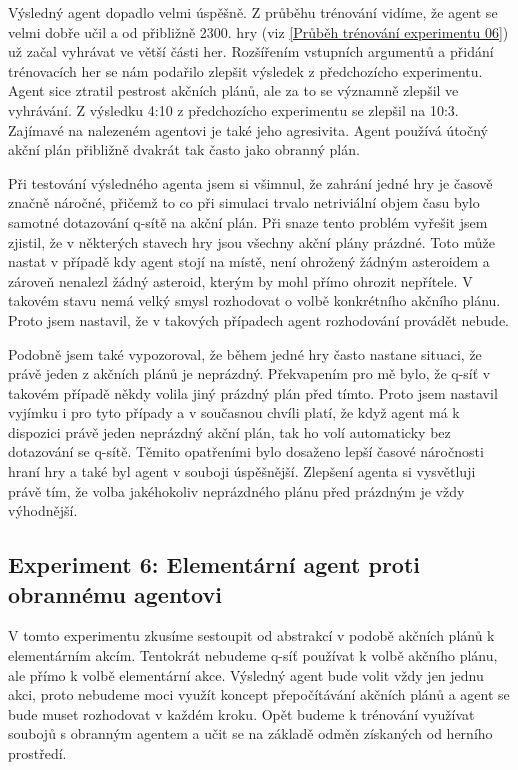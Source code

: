 Výsledný agent dopadlo velmi úspěšně. Z průběhu trénování vidíme, že agent se velmi dobře učil a od přibližně 2300. hry (viz \ref{Průběh trénování experimentu 06}) už začal vyhrávat ve větší části her.
Rozšířením vstupních argumentů a přidání trénovacích her se nám podařilo zlepšit výsledek z předchozícho experimentu.
Agent sice ztratil pestrost akčních plánů, ale za to se významně zlepšil ve vyhrávání. Z výsledku 4:10 z předchozícho experimentu se zlepšil na 10:3.
Zajímavé na nalezeném agentovi je také jeho agresivita. Agent používá útočný akční plán přibližně dvakrát tak často jako obranný plán.

Při testování výsledného agenta jsem si všimnul, že zahrání jedné hry je časově značně náročné, přičemž to co při simulaci trvalo netriviální objem času bylo samotné dotazování q-sítě na akční plán.
Při snaze tento problém vyřešit jsem zjistil, že v některých stavech hry jsou všechny akční plány prázdné. 
Toto může nastat v případě kdy agent stojí na místě, není ohrožený žádným asteroidem a zároveň nenalezl žádný asteroid, kterým by mohl přímo ohrozit nepřítele.
V takovém stavu nemá velký smysl rozhodovat o volbě konkrétního akčního plánu. Proto jsem nastavil, že v takových případech agent rozhodování provádět nebude.

Podobně jsem také vypozoroval, že během jedné hry často nastane situaci, že právě jeden z akčních plánů je neprázdný. Překvapením pro mě bylo, že q-síť v takovém případě někdy volila jiný prázdný plán před tímto.
Proto jsem nastavil vyjímku i pro tyto případy a v současnou chvíli platí, že když agent má k dispozici právě jeden neprázdný akční plán, tak ho volí automaticky bez dotazování se q-sítě.
Těmito opatřeními bylo dosaženo lepší časové náročnosti hraní hry a také byl agent v souboji úspěšnější. Zlepšení agenta si vysvětluji právě tím, že volba jakéhokoliv neprázdného plánu před prázdným je vždy výhodnější.


\newline
{}\newline
{}\newline
{}\newline
{}\newline






\subsection{Experiment 6: Elementární agent proti obrannému agentovi}
V tomto experimentu zkusíme sestoupit od abstrakcí v podobě akčních plánů k elementárním akcím.
Tentokrát nebudeme q-síť používat k volbě akčního plánu, ale přímo k volbě elementární akce.
Výsledný agent bude volit vždy jen jednu akci, proto nebudeme moci využít koncept přepočítávání akčních plánů a agent se bude muset rozhodovat v každém kroku.
Opět budeme k trénování využívat soubojů s obranným agentem a učit se na základě odměn získaných od herního prostředí.

